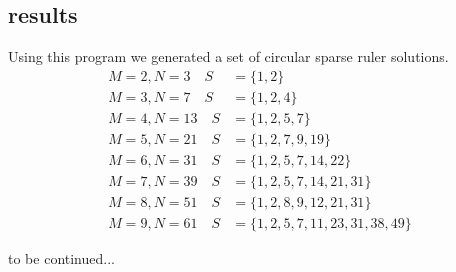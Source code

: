 \documentclass[a4paper, openany, oneside]{memoir}
\begin{document}
\subsection{results}
Using this program we generated a set of circular sparse ruler solutions.
\begin{align}
M=2,N=3  \quad S&=\{1,2\}\\
M=3,N=7  \quad S&=\{1,2,4\}\\
M=4,N=13 \quad S&=\{1,2,5,7\}\\
M=5,N=21 \quad S&=\{1,2,7,9, 19\}\\
M=6,N=31 \quad S&=\{1,2,5,7,14,22\}\\
M=7,N=39 \quad S&=\{1,2,5,7,14,21,31\}\\
M=8,N=51 \quad S&=\{1,2,8,9,12,21,31\}\\
M=9,N=61 \quad S&=\{1,2,5,7,11,23,31, 38, 49\}
\end{align}

to be continued...
\end{document}
